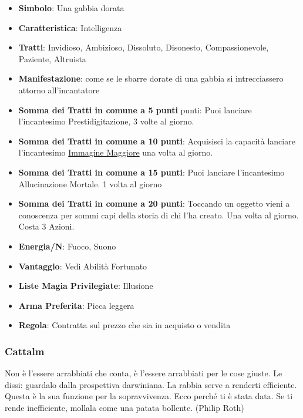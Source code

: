 \begin{multicols}{2}
\begin{itemize}[leftmargin=*] \setlength{\itemsep}{0pt}
\item \textbf{Simbolo}: Una gabbia dorata
\item \textbf{Caratteristica}: Intelligenza
\item \textbf{Tratti}: Invidioso, Ambizioso, Dissoluto, Disonesto, Compassionevole, Paziente, Altruista
\item \textbf{Manifestazione}: come se le sbarre dorate di una gabbia si intrecciassero attorno all'incantatore
\item \textbf{Somma dei Tratti in comune a 5 punti} punti: Puoi lanciare l'incantesimo Prestidigitazione, 3 volte al giorno.
\item \textbf{Somma dei Tratti in comune a 10 punti}: Acquisisci la capacità lanciare l'incantesimo \hyperlink{Immagine Maggiore}{Immagine Maggiore} una volta al giorno.
\item \textbf{Somma dei Tratti in comune a 15 punti}: Puoi lanciare l'incantesimo Allucinazione Mortale. 1 volta al giorno
\item \textbf{Somma dei Tratti in comune a 20 punti}: Toccando un oggetto vieni a conoscenza per sommi capi della storia di chi l'ha creato. Una volta al giorno. Costa 3 Azioni.
\item \textbf{Energia/N}: Fuoco, Suono
\item \textbf{Vantaggio}: Vedi Abilità Fortunato
\item \textbf{Liste Magia Privilegiate}: Illusione
\item \textbf{Arma Preferita}: Picca leggera
\item \textbf{Regola}: Contratta sul prezzo che sia in acquisto o vendita
\end{itemize}

\subsubsection{Cattalm}\label{cattalm}\hypertarget{cattalm}{}

\begin{enfasi}{
Non è l'essere arrabbiati che conta, è l'essere arrabbiati per le cose giuste. Le dissi: guardalo dalla prospettiva darwiniana. La rabbia serve a renderti efficiente. Questa è la sua funzione per la sopravvivenza. Ecco perché ti è stata data. Se ti rende inefficiente, mollala come una patata bollente. (Philip Roth)
}\end{enfasi}


\end{multicols}
